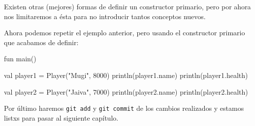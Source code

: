     \begin{note}
      Existen otras (mejores) formas de definir un constructor primario, pero por ahora nos 
      limitaremos a ésta para no introducir tantos conceptos nuevos.
    \end{note}

    Ahora podemos repetir el ejemplo anterior, pero usando el constructor primario que acabamos de
    definir:

    \begin{kotlin}
      fun main() {
        val player1 = Player("Mugi", 8000)
        println(player1.name)
        println(player1.health)

        val player2 = Player("Jaiva", 7000)
        println(player2.name)
        println(player2.health)
      }
    \end{kotlin}

    Por último haremos \texttt{git add} y \texttt{git commit} de los cambios realizados y estamos
    listxs para pasar al siguiente capítulo.